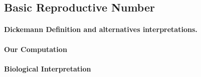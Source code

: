
\subsection{Basic Reproductive Number}
\paragraph{Dickemann Definition and alternatives interpretations.}
\paragraph{Our Computation}
\paragraph{Biological Interpretation}